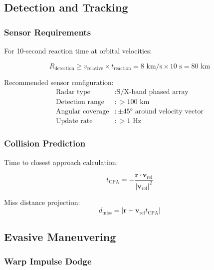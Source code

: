 \documentclass[12pt,a4paper]{article}
\begin{document}
\subsection{Detection and Tracking}

\subsubsection{Sensor Requirements}

For 10-second reaction time at orbital velocities:

\begin{equation}
R_{\text{detection}} \geq v_{\text{relative}} \times t_{\text{reaction}} = 8 \text{ km/s} \times 10 \text{ s} = 80 \text{ km}
\end{equation}

Recommended sensor configuration:
\begin{align}
\text{Radar type} &: \text{S/X-band phased array} \\
\text{Detection range} &: > 100 \text{ km} \\
\text{Angular coverage} &: \pm 45° \text{ around velocity vector} \\
\text{Update rate} &: > 1 \text{ Hz}
\end{align}

\subsubsection{Collision Prediction}

Time to closest approach calculation:

\begin{equation}
t_{\text{CPA}} = -\frac{\mathbf{r} \cdot \mathbf{v}_{\text{rel}}}{|\mathbf{v}_{\text{rel}}|^2}
\end{equation}

Miss distance projection:
\begin{equation}
d_{\text{miss}} = |\mathbf{r} + \mathbf{v}_{\text{rel}} t_{\text{CPA}}|
\end{equation}

\subsection{Evasive Maneuvering}

\subsubsection{Warp Impulse Dodge}
\end{document}
